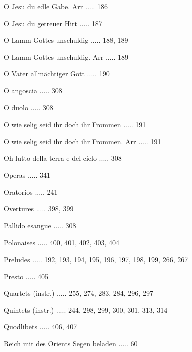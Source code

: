 \documentclass[twocolumn]{book}
\begin{document}
\newline 
O Jesu du edle Gabe. Arr ..... 186

\newline 
O Jesu du getreuer Hirt ..... 187

\newline 
O Lamm Gottes unschuldig ..... 188, 189

\newline 
O Lamm Gottes unschuldig. Arr ..... 189

\newline 
O Vater allmächtiger Gott ..... 190

\newline 
O angoscia ..... 308

\newline 
O duolo ..... 308

\newline 
O wie selig seid ihr doch ihr Frommen ..... 191

\newline 
O wie selig seid ihr doch ihr Frommen. Arr ..... 191

\newline 
Oh lutto della terra e del cielo ..... 308

\newline 
Operas ..... 341

\newline 
Oratorios ..... 241

\newline 
Overtures ..... 398, 399

\newline 
Pallido esangue ..... 308

\newline 
Polonaises ..... 400, 401, 402, 403, 404

\newline 
Preludes ..... 192, 193, 194, 195, 196, 197, 198, 199, 266, 267

\newline 
Presto ..... 405

\newline 
Quartets (instr.) ..... 255, 274, 283, 284, 296, 297

\newline 
Quintets (instr.) ..... 244, 298, 299, 300, 301, 313, 314

\newline 
Quodlibets ..... 406, 407

\newline 
Reich mit des Orients Segen beladen ..... 60
\end{document}
